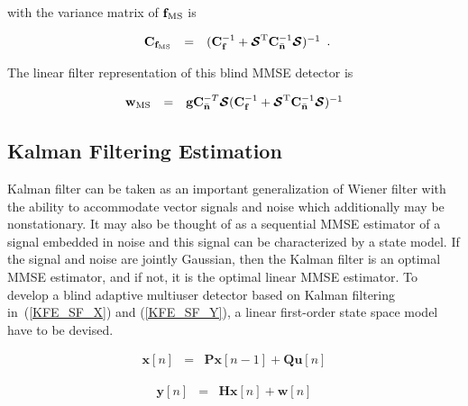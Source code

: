 \documentclass[a4paper,11pt,fleqn]{article}
\newcommand{\bC}{{\bf C}}
\newcommand{\bg}{{\bf g}}
\newcommand{\bn}{{\bf n}}
\newcommand{\bw}{{\bf w}}
\newcommand{\bbf}{{\bf f}}
\newcommand{\bcS}{{\mbox {\boldmath ${\cal S}$}}}
\begin{document}
\noindent with the variance matrix of ${\bbf}_{\rm MS}$ is

\begin{equation}
\begin{array}{rcl}
\bC_{{\bbf_{\rm MS}}} &=& (\bC_{\bbf}^{-1}+\bcS^{\rm
T}\bC_{\bar{\bn}}^{-1}\bcS)^{-1}
\end{array}.
\end{equation}

The linear filter representation of this blind MMSE detector is

\begin{equation}
\begin{array}{rcl}
{\bw}_{\rm MS} &=&\bg
\bC_{\bar{\bn}}^{-T}\bcS(\bC_{\bbf}^{-1}+\bcS^{\rm
T}\bC_{\bar{\bn}}^{-1}\bcS)^{-1}
\end{array} \label{w_MSE}
\end{equation}


\subsection{Kalman Filtering Estimation}
Kalman filter can be taken as an important generalization of
Wiener filter with the ability to accommodate vector signals and
noise which additionally may be nonstationary. It may also be
thought of as a sequential MMSE estimator of a signal embedded in
noise and this signal can be characterized by a state model. If
the signal and noise are jointly Gaussian, then the Kalman filter
is an optimal MMSE estimator, and if not, it is the optimal linear
MMSE estimator. To develop a blind adaptive multiuser detector
based on Kalman filtering in~(\ref{KFE_SF_X}) and
(\ref{KFE_SF_Y}), a linear first-order state space model have to
be devised.


\begin{equation}
\begin{array}{rcl}
\mathbf{x}[n]&=&\mathbf{P}\mathbf{x}[n-1] +
\mathbf{Q}\mathbf{u}[n]
\end{array} \label{KFE_SF_X}
\end{equation}

\begin{equation}
\begin{array}{rcl}
\mathbf{y}[n]&=&\mathbf{H}\mathbf{x}[n] + \mathbf{w}[n]
\end{array} \label{KFE_SF_Y}
\end{equation}






\end{document}
